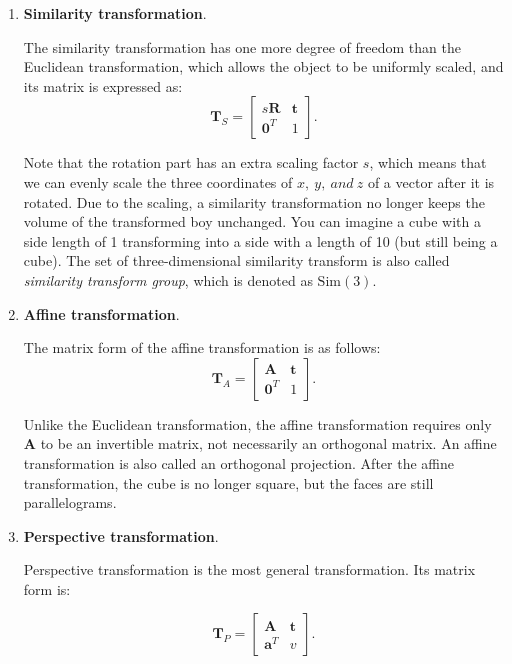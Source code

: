 \begin{enumerate}
	\item {\textbf{Similarity transformation}}.
	
	The similarity transformation has one more degree of freedom than the Euclidean transformation, which allows the object to be uniformly scaled, and its matrix is ​​expressed as:
	\begin{equation}
	\mathbf{T}_S = \left[ {\begin{array}{*{20}{c}}
		{s \mathbf{R}}& \mathbf{t}\\
		{{ \mathbf{0}^T}}&1
		\end{array}} \right].
	\end{equation}
	
	Note that the rotation part has an extra scaling factor $s$, which means that we can evenly scale the three coordinates of $x,\ y,\ and\ z$ of a vector after it is rotated. Due to the scaling, a similarity transformation no longer keeps the volume of ​​the transformed boy unchanged. You can imagine a cube with a side length of 1 transforming into a side with a length of 10 (but still being a cube). The set of three-dimensional similarity transform is also called \textit{similarity transform group}, which is denoted as $\mathrm{Sim}(3)$.
	
	\item {\textbf{Affine transformation}}.
	
	The matrix form of the affine transformation is as follows:
	\begin{equation}
	\mathbf{T}_A = \left[ {\begin{array}{*{20}{c}}
		\mathbf{A} & \mathbf{t}\\
		{{\mathbf{0}^T}} & 1
		\end{array}} \right].
	\end{equation}
	

	Unlike the Euclidean transformation, the affine transformation requires only $\mathbf{A}$ to be an invertible matrix, not necessarily an orthogonal matrix. An affine transformation is also called an orthogonal projection. After the affine transformation, the cube is no longer square, but the faces are still parallelograms.	
	
	\item{ \textbf{Perspective transformation}. }
	
	Perspective transformation is the most general transformation. Its matrix form is:
	
	\begin{equation}
	{\mathbf{T}_P} = \left[ {\begin{array}{*{20}{c}}
		\mathbf{A} & \mathbf{t}\\
		{{\mathbf{a}^T}} & v
		\end{array}} \right].
	\end{equation}
	

\end{enumerate}
